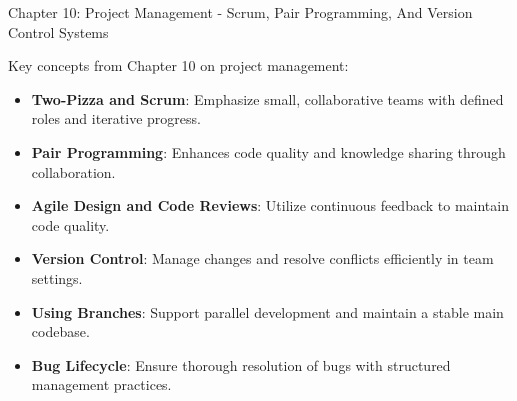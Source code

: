 \begin{notes}{Chapter 10: Project Management - Scrum, Pair Programming, And Version Control Systems}
\begin{highlight}
    \end{highlight}
    
    \begin{highlight}
    
        Key concepts from Chapter 10 on project management:
        
        \begin{itemize}
            \item \textbf{Two-Pizza and Scrum}: Emphasize small, collaborative teams with defined roles and iterative progress.
            \item \textbf{Pair Programming}: Enhances code quality and knowledge sharing through collaboration.
            \item \textbf{Agile Design and Code Reviews}: Utilize continuous feedback to maintain code quality.
            \item \textbf{Version Control}: Manage changes and resolve conflicts efficiently in team settings.
            \item \textbf{Using Branches}: Support parallel development and maintain a stable main codebase.
            \item \textbf{Bug Lifecycle}: Ensure thorough resolution of bugs with structured management practices.
        \end{itemize}
        
    \end{highlight}
\end{notes}